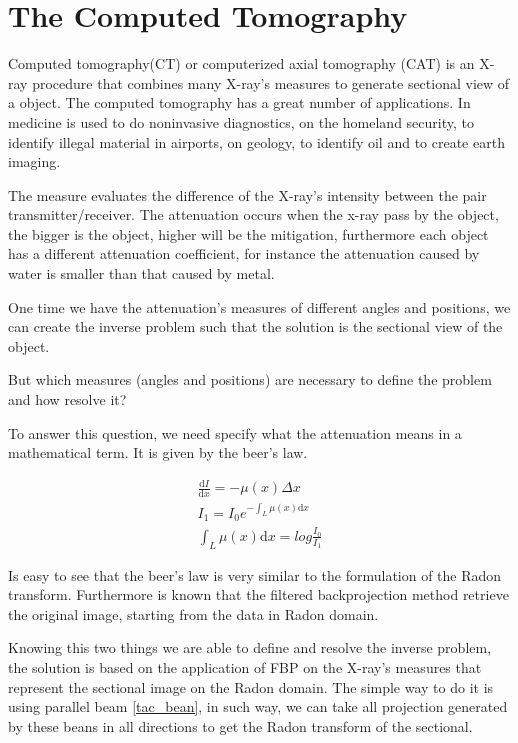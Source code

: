 \section{The Computed Tomography}

Computed tomography(CT) or computerized axial tomography (CAT) is an X-ray procedure that combines many X-ray's measures to generate sectional view of a object. The computed tomography has a great number of applications. In medicine is used to do noninvasive diagnostics, on the homeland security, to identify illegal material in airports, on geology, to identify oil and to create earth imaging.

The measure evaluates the difference of the X-ray's intensity between the pair transmitter/receiver. The attenuation occurs when the x-ray pass by the object, the bigger is the object, higher will be the mitigation, furthermore each object has a different attenuation coefficient, for instance the attenuation caused by water is smaller than that caused by metal.

One time we have the attenuation's measures of different angles and positions, we can create the inverse problem such that the solution is the sectional view of the object.

But which measures (angles and positions) are necessary to define the problem and how resolve it?

To answer this question, we need specify what the attenuation means in a mathematical term. It is given by the beer's law.

\begin{eqnarray}\label{beer}
\frac{\mathrm{d}I}{\mathrm{d}x} = -\mu(x)\Delta x \nonumber  \\
I_1 = I_0e^{-\int_L{\mu(x)\mathrm{d}x}} \nonumber  \\
\int_L{\mu(x)\mathrm{d}x} = log{\frac{I_0}{I_1}}
\end{eqnarray}

Is easy to see that the beer's law is very similar to the formulation of the Radon transform. Furthermore is known that the filtered backprojection method retrieve the original image, starting from the data in Radon domain. 

Knowing this two things we are able to define and resolve the inverse problem, the solution is based on the application of FBP on the X-ray's measures that represent the sectional image on the Radon domain. The simple way to do it is using parallel beam \eqref{tac_bean}, in such way, we can take all projection generated by these beans in all directions to get the Radon transform of the sectional.

